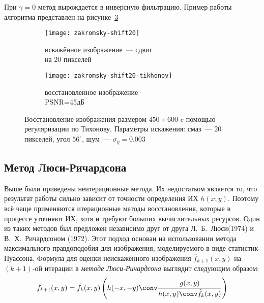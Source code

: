 При $\gamma = 0$ метод вырождается в инверсную фильтрацию. Пример работы алгоритма представлен на рисунке~\ref{fig:tikhonov}
\begin{figure}[h!]
	\begin{subfigure}[b]{0.5\textwidth}
		\texttt{[image: zakromsky-shift20]}
		\caption{искажённое изображение~--- сдвиг \\на 20 пикселей}
		\label{fig:zakromskiyShift20}
	\end{subfigure}%
	\begin{subfigure}[b]{0.5\textwidth}
		\texttt{[image: zakromsky-shift20-tikhonov]}
		\caption{восстановленное изображение\\ PSNR=45дБ}
		\label{fig:zakromskiyShift20Tikhonov}
	\end{subfigure}%
	\caption{Восстановление изображения размером $450\times 600$ c помощью регуляризации по Тихонову. Параметры искажения: смаз~--- 20 пикселей, угол $56^\circ$, шум~--- $\sigma_\eta=0.003$}
	\label{fig:tikhonov}
\end{figure}

\subsection{Метод Люси-Ричардсона}
Выше были приведены неитерационные метода. Их недостатком является то, что результат работы сильно зависит от точности определения ИХ $h(x,y)$. Поэтому всё чаще применяются итерационные методы восстановления, которые в процессе уточняют ИХ, хотя и требуют больших вычислительных ресурсов. Один из таких методов был предложен независимо друг от друга Л.~Б.~Люси(1974)\cite{lucy} и В.~Х.~Ричардсоном (1972)\cite{richardson}. Этот подход основан на использовании метода максимального правдоподобия для изображения, моделируемого в виде статистик Пуассона. Формула для оценки неискажённого изображения $\hat{f}_{k+1}(x,y)$ на $(k + 1)$-ой итерации в \textit{методе Люси-Ричардсона} выглядит следующим образом:
\begin{equation}\label{eq:lucy}
	\hat{f}_{k+1}(x,y) = \hat{f}_k(x,y) \left(h(-x,-y) \conv \frac{g(x,y)}{h(x,y) \conv \hat{f}_k(x,y)}\right)
\end{equation}

